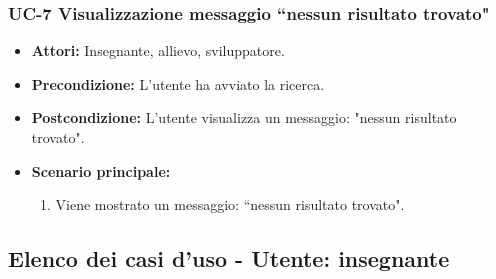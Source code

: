 \subsubsection{UC-7 Visualizzazione messaggio ``nessun risultato trovato"}
\begin{itemize}
		\item \textbf{Attori:} Insegnante, allievo, sviluppatore.
		
		\item \textbf{Precondizione:} L'utente ha avviato la ricerca. 
		\item \textbf{Postcondizione:} L'utente visualizza un messaggio: "nessun risultato trovato".
		\item \textbf{Scenario principale: }
		\begin{enumerate}
			\item Viene mostrato un messaggio: ``nessun risultato trovato".
		\end{enumerate}
\end{itemize}

\subsection{Elenco dei casi d'uso - Utente: insegnante}		
